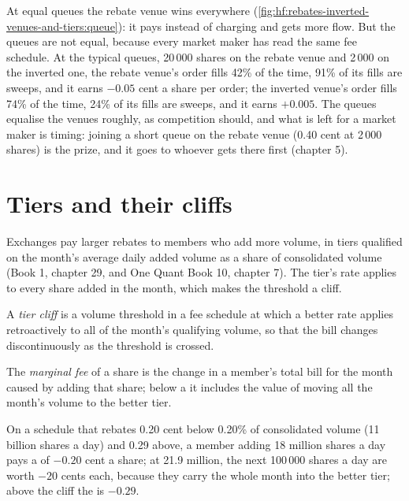 At equal queues the rebate venue wins everywhere (\cref{fig:hf:rebates-inverted-venues-and-tiers:queue}): it pays instead of charging and gets more
flow. But the queues are not equal, because every market maker has read the same fee schedule. At the typical queues, 20\,000 shares on the rebate
venue and 2\,000 on the inverted one, the rebate venue's order fills 42\% of the time, 91\% of its fills are sweeps, and it earns $-0.05$ cent a share
per order; the inverted venue's order fills 74\% of the time, 24\% of its fills are sweeps, and it earns $+0.005$. The queues equalise the venues
roughly, as competition should, and what is left for a market maker is timing: joining a short queue on the rebate venue (0.40 cent at 2\,000
shares) is the prize, and it goes to whoever gets there first (chapter 5).

\section{Tiers and their cliffs}

Exchanges pay larger rebates to members who add more volume, in tiers qualified on the month's average daily added volume as a share of
consolidated volume (Book 1, chapter 29, and One Quant Book 10, chapter 7). The tier's rate applies to every share added in the month, which makes
the threshold a cliff.

\begin{definition}\label{def:hf:rebates-inverted-venues-and-tiers:cliff}
A \emph{tier cliff} is a volume threshold in a fee schedule at which a better rate applies retroactively to all of the month's
qualifying volume, so that the bill changes discontinuously as the threshold is crossed.
\end{definition}

\begin{definition}\label{def:hf:rebates-inverted-venues-and-tiers:marginal}
The \emph{marginal fee} of a share is the change in a member's total bill for the month caused by adding that share; below a  it includes the value of moving all the month's volume to the better tier.
\end{definition}

On a schedule that rebates 0.20 cent below 0.20\% of consolidated volume (11 billion shares a day) and 0.29 above, a member adding 18 million shares
a day pays a  of $-0.20$ cent a share; at 21.9 million, the next 100\,000 shares a day are worth $-20$ cents each, because they carry the
whole month into the better tier; above the cliff the  is $-0.29$.

